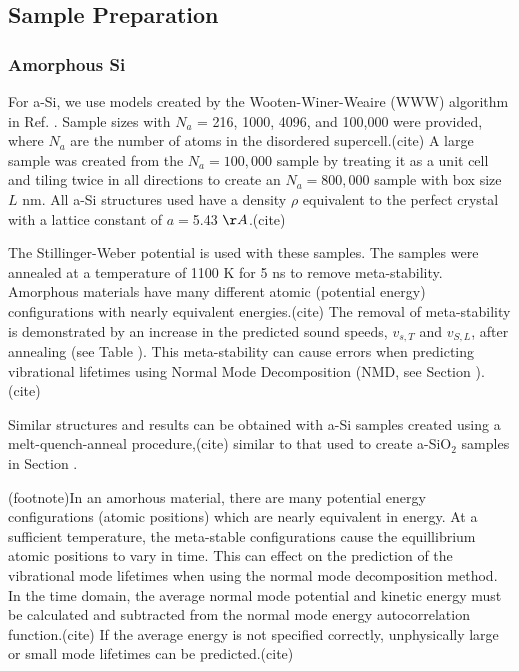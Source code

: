 \documentclass[aps,prb,twocolumn,superscriptaddress,footinbib,amsmath,amssymb,floatfix]{revtex4}
\begin{document}
\subsection{\label{S:Sample}Sample Preparation}

\subsubsection{\label{S:Sample:Si}Amorphous Si}

For a-Si, we use models created by the Wooten-Winer-Weaire (WWW) algorithm in  
Ref. .  Sample sizes with $N_a$ =  
216, 1000, 4096, and 100,000 were provided, where $N_a$ are the number of 
atoms in the disordered supercell.(cite)  
A large sample was created from the $N_a = 100,000$ sample 
by treating it 
as a unit cell and tiling twice in all directions to create an 
$N_a = 800,000$ sample with box size $L$ nm. 
All a-Si structures used have a density $\rho$ equivalent to the perfect 
crystal with a lattice constant of $a=$5.43 $\AA$.(cite) 

The Stillinger-Weber potential is 
used with these samples.  
The samples were annealed at a temperature of 1100 K for 5 ns to remove 
meta-stability. Amorphous materials have many different atomic 
(potential energy) 
configurations with nearly equivalent energies.(cite)  
The removal of meta-stability is demonstrated 
by an increase in the predicted sound speeds, 
$v_{s,T}$ and $v_{S,L}$, after 
annealing (see Table ).  This meta-stability can 
cause errors when predicting vibrational lifetimes using Normal 
Mode Decomposition (NMD, see Section ).(cite) 

Similar structures and results can be obtained with a-Si samples 
created using a melt-quench-anneal procedure,(cite) similar to that 
used to create a-SiO$_2$ samples in Section . 

(footnote)In an amorhous material, there are many potential energy 
configurations 
(atomic positions) which are nearly equivalent in energy.  At a sufficient 
temperature, the meta-stable configurations cause the equillibrium 
atomic positions to vary in time.  This can effect on the prediction of 
the vibrational mode 
lifetimes when using the normal 
mode decomposition method. In the time domain, the average normal 
mode potential and kinetic energy must be calculated and subtracted 
from the normal mode energy autocorrelation function.(cite) 
If the average 
energy is not specified correctly, unphysically large or small mode 
lifetimes can be predicted.(cite) 
\end{document}
